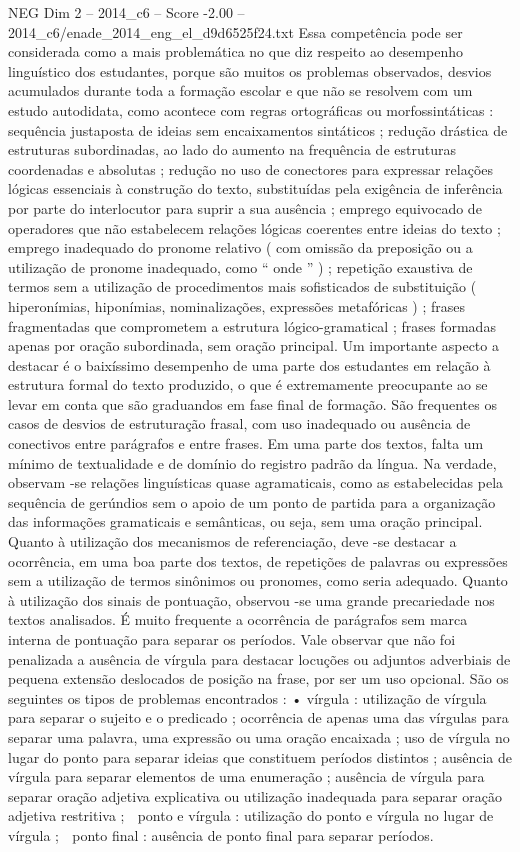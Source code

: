 \begin{textsample}{NEG Dim 2 – 2014\_c6 – Score -2.00 – 2014\_c6/enade\_2014\_eng\_el\_d9d6525f24.txt}
Essa competência pode ser considerada como a mais problemática no que diz respeito ao desempenho linguístico dos estudantes, porque são muitos os problemas observados, desvios acumulados durante toda a formação escolar e que não se resolvem com um estudo autodidata, como acontece com regras ortográficas ou morfossintáticas : sequência justaposta de ideias sem encaixamentos sintáticos ; redução drástica de estruturas subordinadas, ao lado do aumento na frequência de estruturas coordenadas e absolutas ; redução no uso de conectores para expressar relações lógicas essenciais à construção do texto, substituídas pela exigência de inferência por parte do interlocutor para suprir a sua ausência ; emprego equivocado de operadores que não estabelecem relações lógicas coerentes entre ideias do texto ; emprego inadequado do pronome relativo ( com omissão da preposição ou a utilização de pronome inadequado, como “ onde ” ) ; repetição exaustiva de termos sem a utilização de procedimentos mais sofisticados de substituição ( hiperonímias, hiponímias, nominalizações, expressões metafóricas ) ; frases fragmentadas que comprometem a estrutura lógico-gramatical ; frases formadas apenas por oração subordinada, sem oração principal.
Um importante aspecto a destacar é o baixíssimo desempenho de uma parte dos estudantes em relação à estrutura formal do texto produzido, o que é extremamente preocupante ao se levar em conta que são graduandos em fase final de formação.
São frequentes os casos de desvios de estruturação frasal, com uso inadequado ou ausência de conectivos entre parágrafos e entre frases.
Em uma parte dos textos, falta um mínimo de textualidade e de domínio do registro padrão da língua.
Na verdade, observam -se relações linguísticas quase agramaticais, como as estabelecidas pela sequência de gerúndios sem o apoio de um ponto de partida para a organização das informações gramaticais e semânticas, ou seja, sem uma oração principal.
Quanto à utilização dos mecanismos de referenciação, deve -se destacar a ocorrência, em uma boa parte dos textos, de repetições de palavras ou expressões sem a utilização de termos sinônimos ou pronomes, como seria adequado.
Quanto à utilização dos sinais de pontuação, observou -se uma grande precariedade nos textos analisados.
É muito frequente a ocorrência de parágrafos sem marca interna de pontuação para separar os períodos.
Vale observar que não foi penalizada a ausência de vírgula para destacar locuções ou adjuntos adverbiais de pequena extensão deslocados de posição na frase, por ser um uso opcional.
São os seguintes os tipos de problemas encontrados : • vírgula : utilização de vírgula para separar o sujeito e o predicado ; ocorrência de apenas uma das vírgulas para separar uma palavra, uma expressão ou uma oração encaixada ; uso de vírgula no lugar do ponto para separar ideias que constituem períodos distintos ; ausência de vírgula para separar elementos de uma enumeração ; ausência de vírgula para separar oração adjetiva explicativa ou utilização inadequada para separar oração adjetiva restritiva ;  ponto e vírgula : utilização do ponto e vírgula no lugar de vírgula ;  ponto final : ausência de ponto final para separar períodos.

\end{textsample}
